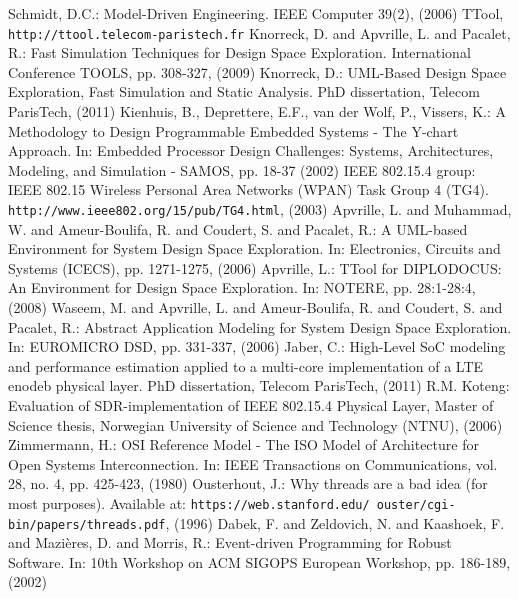 \documentclass{llncs}
\begin{document}
\begin{flushleft}
\begin{thebibliography}{99}
%
Schmidt, D.C.: Model-Driven Engineering. IEEE Computer 39(2), (2006)
%
TTool, {\tt http://ttool.telecom-paristech.fr}
%
Knorreck, D. and Apvrille, L. and Pacalet, R.: Fast Simulation Techniques for Design Space Exploration. International
Conference TOOLS, pp. 308-327, (2009)
%
Knorreck, D.: UML-Based Design Space Exploration, Fast Simulation and Static Analysis. PhD dissertation, Telecom
ParisTech, (2011)
%
Kienhuis, B., Deprettere, E.F., van der Wolf, P., Vissers, K.: A Methodology to Design Programmable Embedded Systems - The
Y-chart Approach. In: Embedded Processor Design Challenges: Systems, Architectures, Modeling, and Simulation - SAMOS, pp. 18-37
(2002)
%
IEEE 802.15.4 group: IEEE 802.15 Wireless Personal Area Networks (WPAN) Task Group 4 (TG4).
\texttt{http://www.ieee802.org/15/pub/TG4.html}, (2003)
%
Apvrille, L. and Muhammad, W. and Ameur-Boulifa, R. and Coudert, S. and Pacalet, R.: A UML-based Environment for System
Design Space Exploration. In: Electronics, Circuits and Systems (ICECS), pp. 1271-1275, (2006)
%
Apvrille, L.: TTool for DIPLODOCUS: An Environment for Design Space Exploration. In: NOTERE, pp. 28:1-28:4, (2008)
%
Waseem, M. and Apvrille, L. and Ameur-Boulifa, R. and Coudert, S. and Pacalet, R.: Abstract Application Modeling for
System Design Space Exploration. In: EUROMICRO DSD, pp. 331-337, (2006)
%
Jaber, C.: High-Level SoC modeling and performance estimation applied to a multi-core implementation of a LTE enodeb
physical layer. PhD dissertation, Telecom ParisTech, (2011)
%
R.M. Koteng: Evaluation of SDR-implementation of IEEE 802.15.4 Physical Layer, Master of Science thesis, Norwegian
University of Science and Technology (NTNU), (2006)
%
Zimmermann, H.: OSI Reference Model - The ISO Model of Architecture for Open Systems Interconnection. In: IEEE
Transactions on Communications, vol. 28, no. 4, pp. 425-423, (1980)
%
Ousterhout, J.: Why threads are a bad idea (for most purposes). Available at:
\texttt{https://web.stanford.edu/~ouster/cgi-bin/papers/threads.pdf}, (1996)
%
Dabek, F. and Zeldovich, N. and Kaashoek, F. and Mazi\`{e}res, D. and Morris, R.: Event-driven Programming for Robust
Software. In: 10th Workshop on ACM SIGOPS European Workshop, pp. 186-189, (2002)

\end{thebibliography}
\end{flushleft}
\end{document}
